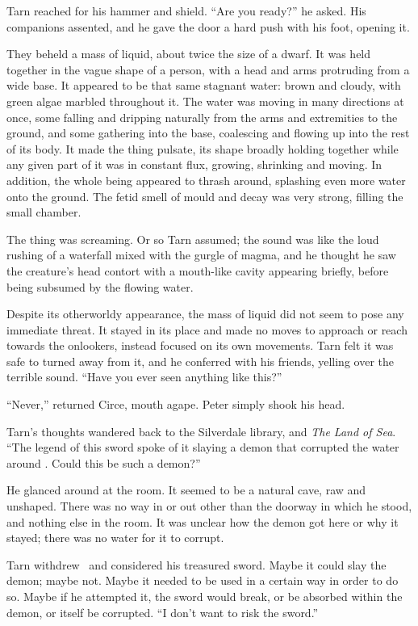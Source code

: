 Tarn reached for his hammer and shield.  ``Are you ready?'' he asked.  His companions assented, and he gave the door a hard push with his foot, opening it.

They beheld a mass of liquid, about twice the size of a dwarf.  It was held together in the vague shape of a person, with a head and arms protruding from a wide base.  It appeared to be that same stagnant water: brown and cloudy, with green algae marbled throughout it.  The water was moving in many directions at once, some falling and dripping naturally from the arms and extremities to the ground, and some gathering into the base, coalescing and flowing up into the rest of its body.  It made the thing pulsate, its shape broadly holding together while any given part of it was in constant flux, growing, shrinking and moving.  In addition, the whole being appeared to thrash around, splashing even more water onto the ground.  The fetid smell of mould and decay was very strong, filling the small chamber.

The thing was screaming.  Or so Tarn assumed; the sound was like the loud rushing of a waterfall mixed with the gurgle of magma, and he thought he saw the creature's head contort with a mouth-like cavity appearing briefly, before being subsumed by the flowing water.

Despite its otherworldy appearance, the mass of liquid did not seem to pose any immediate threat.  It stayed in its place and made no moves to approach or reach towards the onlookers, instead focused on its own movements.  Tarn felt it was safe to turned away from it, and he conferred with his friends, yelling over the terrible sound.  ``Have you ever seen anything like this?''

``Never,'' returned Circe, mouth agape.  Peter simply shook his head.

Tarn's thoughts wandered back to the Silverdale library, and \emph{The Land of Sea}.  ``The legend of this sword spoke of it slaying a demon that corrupted the water around \valdunmir.  Could this be such a demon?''

He glanced around at the room.  It seemed to be a natural cave, raw and unshaped.  There was no way in or out other than the doorway in which he stood, and nothing else in the room.  It was unclear how the demon got here or why it stayed; there was no water for it to corrupt.

Tarn withdrew \kildir\ and considered his treasured sword.  Maybe it could slay the demon; maybe not.  Maybe it needed to be used in a certain way in order to do so.  Maybe if he attempted it, the sword would break, or be absorbed within the demon, or itself be corrupted. ``I don't want to risk the sword.''

